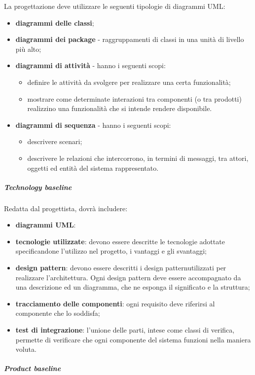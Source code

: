 			La progettazione deve utilizzare le seguenti tipologie di diagrammi UML:
			\begin{itemize}
				\item \textbf{diagrammi delle classi};
				\item \textbf{diagrammi dei package} - raggruppamenti di classi in una unità di livello più alto;
				\item \textbf{diagrammi di attività} - hanno i seguenti scopi:
					\begin{itemize}
						\item definire le attività da svolgere per realizzare una certa funzionalità;
						\item mostrare come determinate interazioni tra componenti (o tra prodotti) realizzino una funzionalità che si intende rendere disponibile.
					\end{itemize}
				\item \textbf{diagrammi di sequenza} - hanno i seguenti scopi:		
					\begin{itemize}
						\item descrivere scenari;	
						\item descrivere le relazioni che intercorrono, in termini di messaggi, tra attori, oggetti ed entità del sistema rappresentato.
					\end{itemize}						
			\end{itemize}
			\subparagraph{Technology baseline}
			Redatta dal progettista, dovrà includere:
			\begin{itemize}
				\item \textbf{diagrammi UML\glo}:
				\item \textbf{tecnologie utilizzate}: devono essere descritte le tecnologie adottate specificandone l'utilizzo nel progetto, i vantaggi e gli svantaggi;
				\item \textbf{design pattern}: devono essere descritti i design pattern\glosp utilizzati per realizzare l'architettura. Ogni design pattern deve essere accompagnato da una descrizione ed un diagramma, che ne esponga il significato e la struttura;
				\item \textbf{tracciamento delle componenti}: ogni requisito deve riferirsi al componente che lo soddisfa;
				\item \textbf{test di integrazione}: l'unione delle parti, intese come classi di verifica, permette di verificare che ogni componente del sistema funzioni nella maniera voluta.
			\end{itemize}
			\subparagraph{Product baseline}
